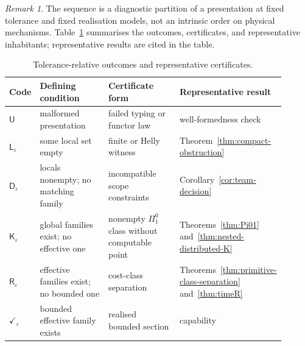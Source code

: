 \documentclass[11pt]{article}
\theoremstyle{plain}
\theoremstyle{definition}
\theoremstyle{remark}
\newtheorem{remark}[theorem]{Remark}
\newcommand{\eps}{\varepsilon}
\begin{document}
\begin{remark}\label{rem:ladder}
The sequence is a diagnostic partition of a presentation at fixed tolerance and
fixed realisation models, not an intrinsic order on physical mechanisms.
Table~\ref{tab:ladder} summarises the outcomes, certificates, and representative inhabitants; representative results are cited in the table.
\end{remark}

\begin{table}[htbp]
\centering
\caption{Tolerance-relative outcomes and representative certificates.}
\label{tab:ladder}
\begin{tabular}{@{}p{0.09\linewidth}p{0.27\linewidth}p{0.28\linewidth}p{0.26\linewidth}@{}}
\toprule
Code & Defining condition & Certificate form & Representative result\\
\midrule
$\mathsf U$ & malformed presentation & failed typing or functor law & well-formedness check\\
$\mathsf L_\eps$ & some local set empty & finite or Helly witness & Theorem~\ref{thm:compact-obstruction}\\
$\mathsf D_\eps$ & locals nonempty; no matching family & incompatible scope constraints & Corollary~\ref{cor:team-decision}\\
$\mathsf K_\eps$ & global families exist; no effective one & nonempty $\Pi^0_1$ class without computable point & Theorems~\ref{thm:Pi01} and~\ref{thm:nested-distributed-K}\\
$\mathsf R_\eps$ & effective families exist; no bounded one & cost-class separation & Theorems~\ref{thm:primitive-class-separation} and~\ref{thm:timeR}\\
$\checkmark_\eps$ & bounded effective family exists & realised bounded section & capability\\
\bottomrule
\end{tabular}
\end{table}
\end{document}
